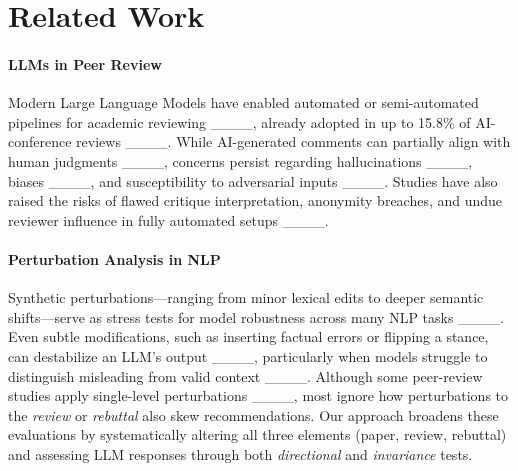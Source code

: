 \section{Related Work}
\paragraph{LLMs in Peer Review}
Modern Large Language Models have enabled automated or semi-automated pipelines for academic reviewing ____, already adopted in up to 15.8\% of AI-conference reviews ____. While AI-generated comments can partially align with human judgments ____, concerns persist regarding hallucinations ____, biases ____, and susceptibility to adversarial inputs ____. Studies have also raised the risks of flawed critique interpretation, anonymity breaches, and undue reviewer influence in fully automated setups ____.

\paragraph{Perturbation Analysis in NLP}
Synthetic perturbations---ranging from minor lexical edits to deeper semantic shifts---serve as
stress tests for model robustness across many NLP tasks ____. Even subtle modifications, such as
inserting factual errors or flipping a stance, can destabilize an LLM’s output
____, particularly when
models struggle to distinguish misleading from valid context ____. Although some peer-review studies apply single-level perturbations
____, most ignore how perturbations to the \emph{review} or \emph{rebuttal} also skew
recommendations. Our approach broadens these evaluations by systematically altering all three
elements (paper, review, rebuttal) and assessing LLM responses through both \emph{directional}
and \emph{invariance} tests.